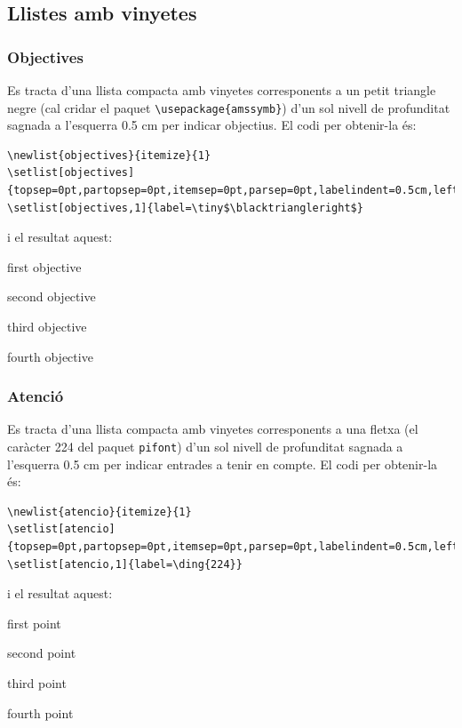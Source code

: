 \documentclass[a4paper,
                             twoside,
                             BCOR1.0cm,
                             DIV11,
                             parskip=full,
                             11pt]{scrbook}
\begin{document}
\subsection{Llistes amb vinyetes}\label{sbsec:llistpics}
\subsubsection{Objectives}\label{ssbsec:objs}
Es tracta d'una llista compacta amb vinyetes corresponents a un petit triangle negre (cal cridar el paquet \verb+\usepackage{amssymb}+) d'un sol nivell de profunditat  sagnada a l'esquerra 0.5 cm per indicar objectius. El codi per obtenir-la és:
\begin{tiny}
\begin{verbatim}
\newlist{objectives}{itemize}{1}
\setlist[objectives]{topsep=0pt,partopsep=0pt,itemsep=0pt,parsep=0pt,labelindent=0.5cm,leftmargin=*}
\setlist[objectives,1]{label=\tiny$\blacktriangleright$}
\end{verbatim}
\end{tiny}
i el resultat aquest:

\begin{objectives}
\item  first objective
\item second objective
\item third objective
\item fourth objective
\end{objectives}

\subsubsection{Atenció}\label{ssbsec:at}
Es tracta d'una llista compacta amb vinyetes corresponents a una fletxa (el caràcter 224 del paquet \verb+pifont+) d'un sol nivell de profunditat  sagnada a l'esquerra 0.5 cm per indicar entrades a tenir en compte. El codi per obtenir-la és:
\begin{tiny}
\begin{verbatim}
\newlist{atencio}{itemize}{1}
\setlist[atencio]{topsep=0pt,partopsep=0pt,itemsep=0pt,parsep=0pt,labelindent=0.5cm,leftmargin=*}
\setlist[atencio,1]{label=\ding{224}}
\end{verbatim}
\end{tiny}
i el resultat aquest:

\begin{attention}
\item  first point
\item second point
\item third point
\item fourth point
\end{attention}
\end{document}

